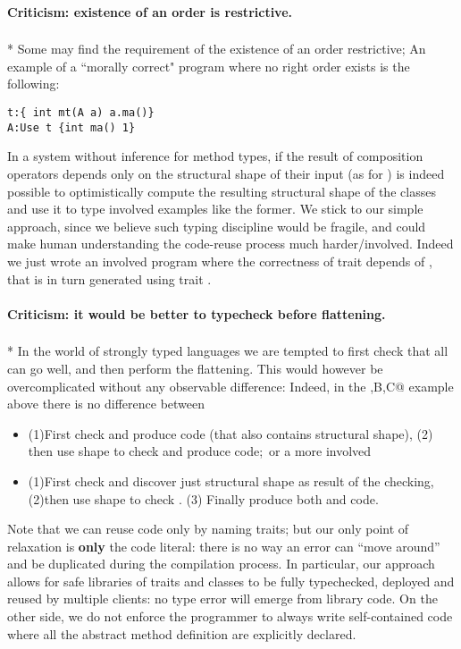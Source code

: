 \paragraph{Criticism: existence of an order is restrictive.}${}_{}$\\*
Some may find the requirement of the existence of an order restrictive;
An example of a ``morally correct" program where no right order exists is the following:
\saveSpace\begin{lstlisting}
t:{ int mt(A a) a.ma()}
A:Use t {int ma() 1}
\end{lstlisting}\saveSpace

In a system without inference for method types,
if the result of composition operators depends only on the
structural shape of their input (as for \use)
is indeed possible to optimistically compute the resulting structural shape of the classes
and use it to type involved examples like the former.
We stick to our simple approach, since we believe such typing discipline would be fragile,
and could make human understanding the code-reuse process much harder/involved.
Indeed we just wrote an involved program where the correctness of trait \Q@t@ depends of 
\Q@A@, that is in turn generated using trait \Q@t@.

\paragraph{Criticism: it would be better to typecheck before flattening.}${}_{}$\\*
In the world of strongly typed languages we are tempted to
first check that all can go well, and then perform the flattening.
This would however be overcomplicated without any observable difference:
Indeed, in the \Q@A,B,C@ example above there is no difference
between
\begin{itemize}
\item  (1)First check \Q@B@ and produce \Q@B@ code (that also contains \Q@B@ structural shape),
  (2) then use \Q@B@ shape to check \Q@C@ and produce \Q@C@ code;\ 
or a more involved
\item  (1)First check \Q@B@ and discover just \Q@B@ structural shape as result of the checking,
  (2)then use \Q@B@ shape to check \Q@C@.
  (3) Finally produce both \Q@B@ and \Q@C@ code.
\end{itemize}

Note that we can reuse code only by naming traits; but our only point of relaxation is {\bf only} the code literal: there is no way an error can ``move around'' and be duplicated during the compilation process.
In particular, our approach allows for safe libraries of traits and classes to be fully typechecked, deployed and reused by multiple clients: no type error will emerge from library code.
On the other side, we do not enforce the programmer to always write self-contained code where all the abstract method definition are explicitly declared.

